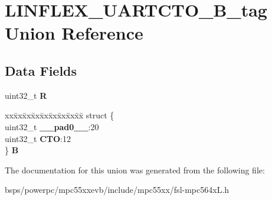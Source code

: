 \hypertarget{unionLINFLEX__UARTCTO__32B__tag}{}\section{L\+I\+N\+F\+L\+E\+X\+\_\+\+U\+A\+R\+T\+C\+T\+O\+\_\+B\+\_\+tag Union Reference}
\label{unionLINFLEX__UARTCTO__32B__tag}
\subsection*{Data Fields}
\begin{DoxyCompactItemize}
\item 
\mbox{\label{unionLINFLEX__UARTCTO__32B__tag_a9265a56893fca3e42f70cc33b7080420}} 
uint32\+\_\+t {\bfseries R}
\item 
\mbox{\label{unionLINFLEX__UARTCTO__32B__tag_a9fd16a56cbac7b047b5b40658b69b5cc}} 
\begin{tabbing}
xx\=xx\=xx\=xx\=xx\=xx\=xx\=xx\=xx\=\kill
struct \{\\
\>uint32\_t {\bfseries \_\_pad0\_\_}:20\\
\>uint32\_t {\bfseries CTO}:12\\
\} {\bfseries B}\\

\end{tabbing}\end{DoxyCompactItemize}


The documentation for this union was generated from the following file\+:\begin{DoxyCompactItemize}
\item 
bsps/powerpc/mpc55xxevb/include/mpc55xx/fsl-\/mpc564x\+L.\+h\end{DoxyCompactItemize}
